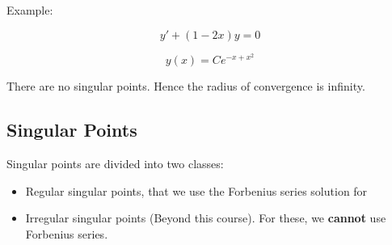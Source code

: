 Example:

$$y' + (1 - 2x)y =0$$

$$y(x) = C e^{-x + x^2}$$

There are no singular points. Hence the radius of convergence is infinity. 

\subsection{Singular Points}

Singular points are divided into two classes:

\begin{itemize}
    \item Regular singular points, that we use the Forbenius series solution for
    \item Irregular singular points (Beyond this course). For these, we \textbf{cannot} use Forbenius series. 
\end{itemize}